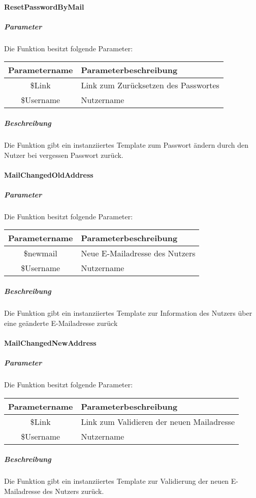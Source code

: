 \paragraph{ResetPasswordByMail}
\subparagraph{Parameter} Die Funktion besitzt folgende Parameter:
\begin{table}[H]
	\begin{tabular}{|c|p{11cm}|}
		\hline
		\textbf{Parametername} & \textbf{Parameterbeschreibung} \\ \hline
		\$Link     & Link zum Zurücksetzen des Passwortes \\ \hline
		\$Username & Nutzername \\ \hline
	\end{tabular}
\end{table}
\subparagraph{Beschreibung} Die Funktion gibt ein instanziiertes Template zum Passwort ändern durch den Nutzer bei vergessen Passwort zurück.
\paragraph{MailChangedOldAddress}
\subparagraph{Parameter} Die Funktion besitzt folgende Parameter:
\begin{table}[H]
	\begin{tabular}{|c|p{11cm}|}
		\hline
		\textbf{Parametername} & \textbf{Parameterbeschreibung} \\ \hline
		\$newmail  & Neue E-Mailadresse des Nutzers \\ \hline
		\$Username & Nutzername \\ \hline
	\end{tabular}
\end{table}
\subparagraph{Beschreibung} Die Funktion gibt ein instanziiertes Template zur Information des Nutzers über eine geänderte E-Mailadresse zurück
\paragraph{MailChangedNewAddress}
\subparagraph{Parameter} Die Funktion besitzt folgende Parameter:
\begin{table}[H]
	\begin{tabular}{|c|p{11cm}|}
		\hline
		\textbf{Parametername} & \textbf{Parameterbeschreibung} \\ \hline
		\$Link     & Link zum Validieren der neuen Mailadresse \\ \hline
		\$Username & Nutzername \\ \hline
	\end{tabular}
\end{table}
\subparagraph{Beschreibung} Die Funktion gibt ein instanziiertes Template zur Validierung der neuen E-Mailadresse des Nutzers zurück.
